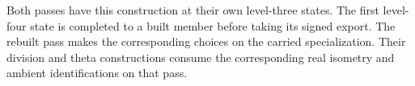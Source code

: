 Both passes have this construction at their own
level-three states. The first level-four state is
completed to a built member before taking its signed
export. The rebuilt pass makes the corresponding choices
on the carried specialization. Their division and theta
constructions consume the corresponding real isometry and
ambient identifications on that pass.
\label{cor:real-row-realization-9}
